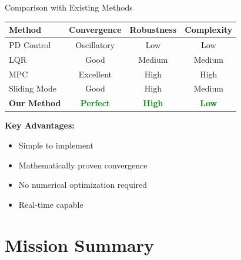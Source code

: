 \documentclass[aspectratio=169]{beamer}
\begin{document}
\begin{frame}{Comparison with Existing Methods}
\begin{table}
\centering
\small
\begin{tabular}{lccc}
\toprule
\textbf{Method} & \textbf{Convergence} & \textbf{Robustness} & \textbf{Complexity} \\
\midrule
PD Control & Oscillatory & Low & Low \\
LQR & Good & Medium & Medium \\
MPC & Excellent & High & High \\
Sliding Mode & Good & High & Medium \\
\textbf{Our Method} & \textcolor{green}{\textbf{Perfect}} & \textcolor{green}{\textbf{High}} & \textcolor{green}{\textbf{Low}} \\
\bottomrule
\end{tabular}
\end{table}

\vspace{1em}
\textbf{Key Advantages:}
\begin{itemize}
    \item Simple to implement
    \item Mathematically proven convergence
    \item No numerical optimization required
    \item Real-time capable
\end{itemize}
\end{frame}

\section{Mission Summary}
\end{document}
